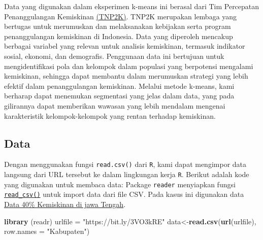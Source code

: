 \documentclass[
  oneside]{book}
\newenvironment{Shaded}{\begin{snugshade}}{\end{snugshade}}
\newcommand{\AttributeTok}[1]{\textcolor[rgb]{0.13,0.29,0.53}{#1}}
\newcommand{\FunctionTok}[1]{\textcolor[rgb]{0.13,0.29,0.53}{\textbf{#1}}}
\newcommand{\NormalTok}[1]{#1}
\newcommand{\OtherTok}[1]{\textcolor[rgb]{0.56,0.35,0.01}{#1}}
\newcommand{\StringTok}[1]{\textcolor[rgb]{0.31,0.60,0.02}{#1}}
\begin{document}
Data yang digunakan dalam eksperimen k-means ini berasal dari Tim Percepatan Penanggulangan Kemiskinan \href{https://www.tnp2k.go.id/}{(TNP2K)}. TNP2K merupakan lembaga yang bertugas untuk merumuskan dan melaksanakan kebijakan serta program penanggulangan kemiskinan di Indonesia. Data yang diperoleh mencakup berbagai variabel yang relevan untuk analisis kemiskinan, termasuk indikator sosial, ekonomi, dan demografis. Penggunaan data ini bertujuan untuk mengidentifikasi pola dan kelompok dalam populasi yang berpotensi mengalami kemiskinan, sehingga dapat membantu dalam merumuskan strategi yang lebih efektif dalam penanggulangan kemiskinan. Melalui metode k-means, kami berharap dapat menemukan segmentasi yang jelas dalam data, yang pada gilirannya dapat memberikan wawasan yang lebih mendalam mengenai karakteristik kelompok-kelompok yang rentan terhadap kemiskinan.

\subsection*{Data}\label{data}

Dengan menggunakan fungsi \texttt{read.csv()} dari \texttt{R}, kami dapat mengimpor data langsung dari URL tersebut ke dalam lingkungan kerja \texttt{R}. Berikut adalah kode yang digunakan untuk membaca data:
Package \texttt{reader} menyiapkan fungsi \href{https://readr.tidyverse.org/reference/read_delim.html}{\texttt{read\_csv()}} untuk import data dari file CSV. Pada kasus ini digunakan data \href{https://github.com/dedenistiawan/Dataset/blob/main/BDT.csv}{Data 40\% Kemiskinan di jawa Tengah}.

\begin{Shaded}
\begin{Highlighting}[]
\FunctionTok{library}\NormalTok{ (readr)}
\NormalTok{urlfile }\OtherTok{=} \StringTok{"https://bit.ly/3VO3kRE"}
\NormalTok{data}\OtherTok{\textless{}{-}}\FunctionTok{read.csv}\NormalTok{(}\FunctionTok{url}\NormalTok{(urlfile), }\AttributeTok{row.names =} \StringTok{"Kabupaten"}\NormalTok{)}
\end{Highlighting}
\end{Shaded}
\end{document}
